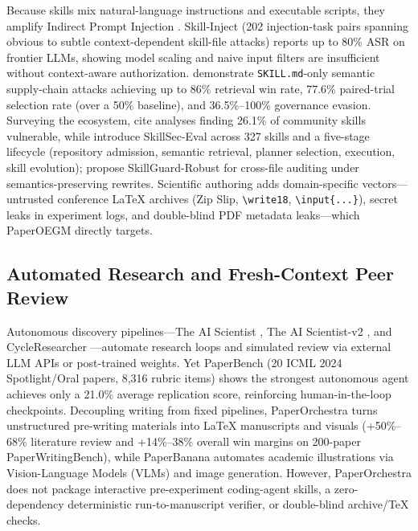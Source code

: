 Because skills mix natural-language instructions and executable scripts, they amplify Indirect Prompt Injection \citep{greshake2023indirect}. Skill-Inject \citep{schmotz2026skillinject} (202 injection-task pairs spanning obvious to subtle context-dependent skill-file attacks) reports up to 80\% ASR on frontier LLMs, showing model scaling and naive input filters are insufficient without context-aware authorization. \citet{saha2026underhood} demonstrate \texttt{SKILL.\allowbreak{}md}-only semantic supply-chain attacks achieving up to 86\% retrieval win rate, 77.6\% paired-trial selection rate (over a 50\% baseline), and 36.5\%--100\% governance evasion. Surveying the ecosystem, \citet{xu2026agentskills} cite analyses finding 26.1\% of community skills vulnerable, while \citet{badhe2026skillsecurity} introduce SkillSec-Eval across 327 skills and a five-stage lifecycle (repository admission, semantic retrieval, planner selection, execution, skill evolution); \citet{lv2026structuredaudit} propose SkillGuard-Robust for cross-file auditing under semantics-preserving rewrites. Scientific authoring adds domain-specific vectors---untrusted conference LaTeX archives (Zip Slip, \texttt{\textbackslash{}write18}, \texttt{\textbackslash{}input\{\textbar{}...\}}), secret leaks in experiment logs, and double-blind PDF metadata leaks---which PaperOEGM directly targets.

\subsection{Automated Research and Fresh-Context Peer Review}\label{automated-research-and-fresh-context-peer-review}

Autonomous discovery pipelines---The AI Scientist \citep{lu2024aiscientist}, The AI Scientist-v2 \citep{yamada2025aiscientistv2}, and CycleResearcher \citep{weng2024cycleresearcher}---automate research loops and simulated review via external LLM APIs or post-trained weights. Yet PaperBench \citep{starace2025paperbench} (20 ICML 2024 Spotlight/Oral papers, 8,316 rubric items) shows the strongest autonomous agent achieves only a 21.0\% average replication score, reinforcing human-in-the-loop checkpoints. Decoupling writing from fixed pipelines, PaperOrchestra \citep{song2026paperorchestra} turns unstructured pre-writing materials into LaTeX manuscripts and visuals (+50\%--68\% literature review and +14\%--38\% overall win margins on 200-paper PaperWritingBench), while PaperBanana \citep{zhu2026paperbanana} automates academic illustrations via Vision-Language Models (VLMs) and image generation. However, PaperOrchestra does not package interactive pre-experiment coding-agent skills, a zero-dependency deterministic run-to-manuscript verifier, or double-blind archive/TeX checks.

